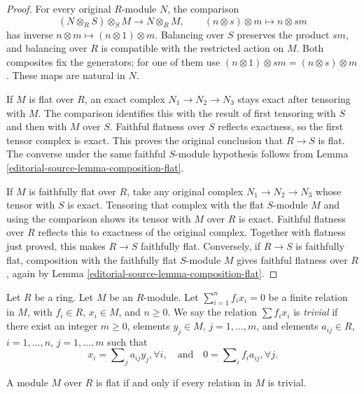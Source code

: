 \begin{proof}
For every original $R$-module $N$, the comparison
$$
(N\otimes_R S)\otimes_S M\longrightarrow N\otimes_R M,
\qquad (n\otimes s)\otimes m\longmapsto n\otimes sm
$$
has inverse $n\otimes m\mapsto(n\otimes1)\otimes m$.
Balancing over $S$ preserves the product $sm$, and balancing
over $R$ is compatible with the restricted action on $M$.
Both composites fix the generators; for one of them use
$(n\otimes1)\otimes sm=(n\otimes s)\otimes m$.
These maps are natural in $N$.

If $M$ is flat over $R$, an exact complex
$N_1\to N_2\to N_3$ stays exact after tensoring with $M$.
The comparison identifies this with the result of first
tensoring with $S$ and then with $M$ over $S$. Faithful
flatness over $S$ reflects exactness, so the first tensor
complex is exact. This proves the original conclusion that
$R\to S$ is flat. The converse under the same faithful
$S$-module hypothesis follows from
Lemma \ref{editorial-source-lemma-composition-flat}.

If $M$ is faithfully flat over $R$, take any original complex
$N_1\to N_2\to N_3$ whose tensor with $S$ is exact. Tensoring
that complex with the flat $S$-module $M$ and using the
comparison shows its tensor with $M$ over $R$ is exact.
Faithful flatness over $R$ reflects this to exactness of the
original complex. Together with flatness just proved, this
makes $R\to S$ faithfully flat. Conversely, if $R\to S$
is faithfully flat, composition with the faithfully flat
$S$-module $M$ gives faithful flatness over $R$, again by
Lemma \ref{editorial-source-lemma-composition-flat}.
\end{proof}

\noindent
Let $R$ be a ring.
Let $M$ be an $R$-module.
Let $\sum_{i=1}^n f_ix_i=0$ be a finite relation in $M$,
with $f_i\in R$, $x_i\in M$, and $n\geq0$.
We say the relation $\sum f_i x_i$
is {\it trivial} if there exist an integer $m \geq 0$,
elements $y_j \in M$, $j = 1, \ldots, m$, and elements $a_{ij} \in R$,
$i = 1, \ldots, n$, $j = 1, \ldots, m$ such that
$$
x_i = \sum\nolimits_j a_{ij} y_j, \forall i,
\quad\text{and}\quad
0 = \sum\nolimits_i f_ia_{ij}, \forall j.
$$

\begin{lemma}
\label{editorial-source-lemma-flat-eq}
A module $M$ over $R$ is flat if and only if
every relation in $M$ is trivial.
\end{lemma}

